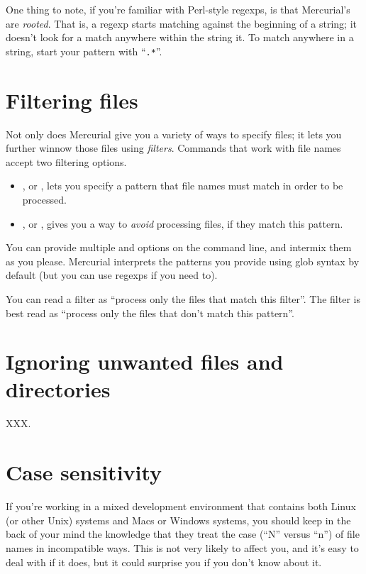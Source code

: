 One thing to note, if you're familiar with Perl-style regexps, is that
Mercurial's are \emph{rooted}.  That is, a regexp starts matching
against the beginning of a string; it doesn't look for a match
anywhere within the string it.  To match anywhere in a string, start
your pattern with ``\texttt{.*}''.

\section{Filtering files}

Not only does Mercurial give you a variety of ways to specify files;
it lets you further winnow those files using \emph{filters}.  Commands
that work with file names accept two filtering options.
\begin{itemize}
\item {}, or , lets you specify a pattern
  that file names must match in order to be processed.
\item {}, or , gives you a way to
  \emph{avoid} processing files, if they match this pattern.
\end{itemize}
You can provide multiple  and  options on the
command line, and intermix them as you please.  Mercurial interprets
the patterns you provide using glob syntax by default (but you can use
regexps if you need to).

You can read a  filter as ``process only the files that
match this filter''.
The  filter is best read as ``process only the files that
don't match this pattern''.

\section{Ignoring unwanted files and directories}

XXX.

\section{Case sensitivity}
\label{sec:names:case}

If you're working in a mixed development environment that contains
both Linux (or other Unix) systems and Macs or Windows systems, you
should keep in the back of your mind the knowledge that they treat the
case (``N'' versus ``n'') of file names in incompatible ways.  This is
not very likely to affect you, and it's easy to deal with if it does,
but it could surprise you if you don't know about it.

